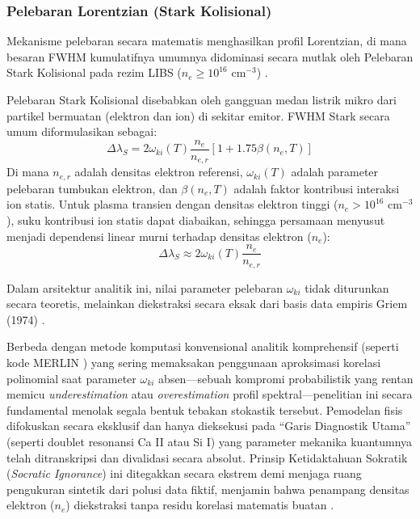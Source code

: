 \documentclass[10pt,leqno]{amsart}
\begin{document}
\subsubsection{Pelebaran Lorentzian (Stark Kolisional)} \label{sec:stark}
Mekanisme pelebaran secara matematis menghasilkan profil Lorentzian, di mana besaran FWHM kumulatifnya umumnya didominasi secara mutlak oleh Pelebaran Stark Kolisional pada rezim LIBS ($n_e \ge 10^{16}$ cm$^{-3}$) \cite{tang_review_2024}.

Pelebaran Stark Kolisional disebabkan oleh gangguan medan listrik mikro dari partikel bermuatan (elektron dan ion) di sekitar emitor. FWHM Stark secara umum diformulasikan sebagai:
\begin{equation} \label{eq:broadening_stark}
\Delta\lambda_S = 2 \omega_{ki}(T) \frac{n_e}{n_{e,r}} \left[ 1 + 1.75 \beta(n_e, T) \right]
\end{equation}
Di mana $n_{e,r}$ adalah densitas elektron referensi, $\omega_{ki}(T)$ adalah parameter pelebaran tumbukan elektron, dan $\beta(n_e, T)$ adalah faktor kontribusi interaksi ion statis. Untuk plasma transien dengan densitas elektron tinggi ($n_e > 10^{16}$ cm$^{-3}$), suku kontribusi ion statis dapat diabaikan, sehingga persamaan menyusut menjadi dependensi linear murni terhadap densitas elektron ($n_e$):
\begin{equation} \label{eq:broadening_stark_simp}
\Delta\lambda_S \approx 2 \omega_{ki}(T) \frac{n_e}{n_{e,r}}
\end{equation}

Dalam arsitektur analitik ini, nilai parameter pelebaran $\omega_{ki}$ tidak diturunkan secara teoretis, melainkan diekstraksi secara eksak dari basis data empiris Griem (1974) \cite{griem_spectral_1974}.

Berbeda dengan metode komputasi konvensional analitik komprehensif (seperti kode MERLIN \cite{favre_merlin_2025}) yang sering memaksakan penggunaan aproksimasi korelasi polinomial saat parameter $\omega_{ki}$ absen---sebuah kompromi probabilistik yang rentan memicu \textit{underestimation} atau \textit{overestimation} profil spektral---penelitian ini secara fundamental menolak segala bentuk tebakan stokastik tersebut. Pemodelan fisis difokuskan secara eksklusif dan hanya dieksekusi pada ``Garis Diagnostik Utama'' (seperti doublet resonansi Ca II atau Si I) yang parameter mekanika kuantumnya telah ditranskripsi dan divalidasi secara absolut. Prinsip Ketidaktahuan Sokratik (\textit{Socratic Ignorance}) ini ditegakkan secara ekstrem demi menjaga ruang pengukuran sintetik dari polusi data fiktif, menjamin bahwa penampang densitas elektron ($n_e$) diekstraksi tanpa residu korelasi matematis buatan \cite{tang_review_2024, manelski_libs_2024}.
\end{document}
